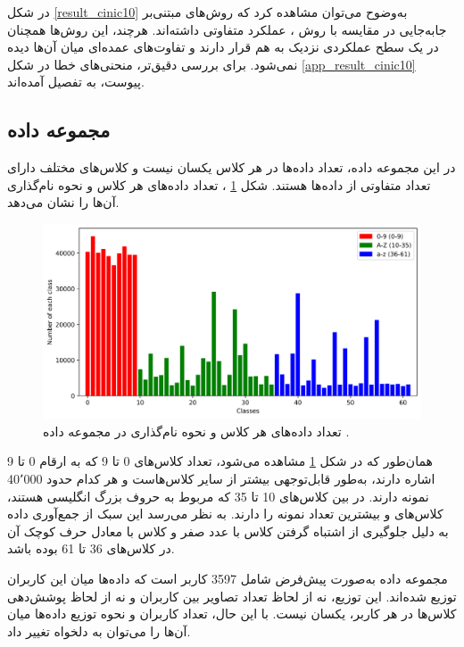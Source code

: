در شکل
\ref{result_cinic10}
به‌وضوح می‌توان مشاهده کرد که روش‌های مبتنی‌بر جابه‌جایی در مقایسه با روش
%
، عملکرد متفاوتی داشته‌اند. هرچند، این روش‌ها همچنان در یک سطح عملکردی نزدیک به هم قرار دارند و تفاوت‌های عمده‌ای میان آن‌ها دیده نمی‌شود. برای بررسی دقیق‌تر، منحنی‌های خطا در شکل
\ref{app_result_cinic10}
پیوست، به تفصیل آمده‌اند.







\FloatBarrier
\subsection{
	مجموعه داده
}
در این مجموعه داده، تعداد داده‌ها در هر کلاس یکسان نیست و کلاس‌های مختلف دارای تعداد متفاوتی از داده‌ها هستند. شکل
\ref{count_all_classes}%
، تعداد داده‌های هر کلاس و نحوه نام‌گذاری آن‌ها را نشان می‌دهد.


\begin{figure}[t]
	\centering
	\includegraphics[scale=0.7]{images/chap5/count_all_classes.png}%
	\caption{%
		تعداد داده‌های هر کلاس و نحوه نام‌گذاری در مجموعه داده
		.
	}
	\label{count_all_classes}
	\centering
\end{figure}

همان‌طور که در شکل
\ref{count_all_classes}
مشاهده می‌شود، تعداد کلاس‌های 0 تا 9 که به ارقام 0 تا 9 اشاره دارند، به‌طور قابل‌توجهی بیشتر از سایر کلاس‌هاست و هر کدام حدود 40٬000 نمونه دارند. در بین کلاس‌های 10 تا 35 که مربوط به حروف بزرگ انگلیسی هستند، کلاس‌های  و  بیشترین تعداد نمونه را دارند. به نظر می‌رسد این سبک از جمع‌آوری داده به دلیل جلوگیری از اشتباه گرفتن کلاس  با عدد صفر و کلاس  با معادل حرف کوچک آن در کلاس‌های 36 تا 61 بوده باشد.


مجموعه داده
به‌صورت پیش‌فرض شامل 3597 کاربر است که داده‌ها میان این کاربران توزیع شده‌اند. این توزیع، نه از لحاظ تعداد تصاویر بین کاربران و نه از لحاظ پوشش‌دهی کلاس‌ها در هر کاربر، یکسان نیست. با این حال، تعداد کاربران و نحوه توزیع داده‌ها میان آن‌ها را می‌توان به دلخواه تغییر داد.



